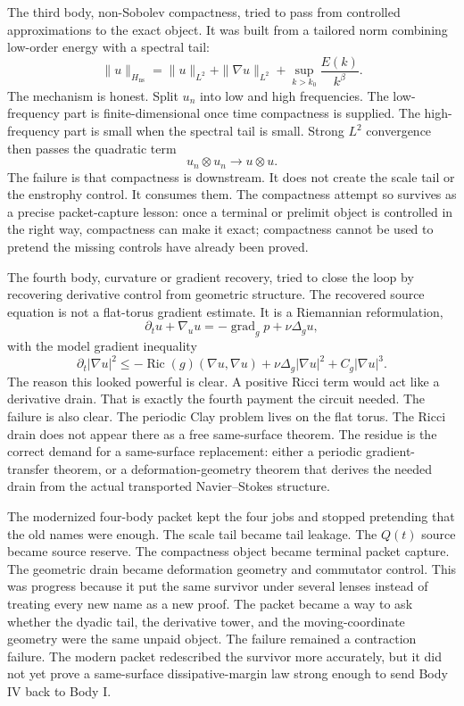 The third body, non-Sobolev compactness, tried to pass from controlled
approximations to the exact object.
It was built from a tailored norm combining low-order energy with a spectral
tail:
\[
  \|u\|_{H_{\mathrm{ns}}}
  =
  \|u\|_{L^2}
  +\|\nabla u\|_{L^2}
  +\sup_{k>k_0}\frac{E(k)}{k^\beta}.
\]
The mechanism is honest.
Split \(u_n\) into low and high frequencies.
The low-frequency part is finite-dimensional once time compactness is supplied.
The high-frequency part is small when the spectral tail is small.
Strong \(L^2\) convergence then passes the quadratic term
\[
  u_n\otimes u_n\to u\otimes u .
\]
The failure is that compactness is downstream.
It does not create the scale tail or the enstrophy control.
It consumes them.
The compactness attempt so survives as a precise packet-capture lesson:
once a terminal or prelimit object is controlled in the right way, compactness
can make it exact; compactness cannot be used to pretend the missing controls
have already been proved.

The fourth body, curvature or gradient recovery, tried to close the loop by
recovering derivative control from geometric structure.
The recovered source equation is not a flat-torus gradient estimate.
It is a Riemannian reformulation,
\[
  \partial_t u+\nabla_u u
  =
  -\operatorname{grad}_g p+\nu\Delta_g u,
\]
with the model gradient inequality
\[
  \partial_t|\nabla u|^2
  \le
  -\operatorname{Ric}(g)(\nabla u,\nabla u)
  +\nu\Delta_g|\nabla u|^2
  +C_g|\nabla u|^3 .
\]
The reason this looked powerful is clear.
A positive Ricci term would act like a derivative drain.
That is exactly the fourth payment the circuit needed.
The failure is also clear.
The periodic Clay problem lives on the flat torus.
The Ricci drain does not appear there as a free same-surface theorem.
The residue is the correct demand for a same-surface replacement: either a
periodic gradient-transfer theorem, or a deformation-geometry theorem that
derives the needed drain from the actual transported Navier--Stokes structure.

The modernized four-body packet kept the four jobs and stopped pretending that
the old names were enough.
The scale tail became tail leakage.
The \(Q(t)\) source became source reserve.
The compactness object became terminal packet capture.
The geometric drain became deformation geometry and commutator control.
This was progress because it put the same survivor under several lenses instead
of treating every new name as a new proof.
The packet became a way to ask whether the dyadic tail, the derivative tower,
and the moving-coordinate geometry were the same unpaid object.
The failure remained a contraction failure.
The modern packet redescribed the survivor more accurately, but it did not yet
prove a same-surface dissipative-margin law strong enough to send Body IV back to Body I.

